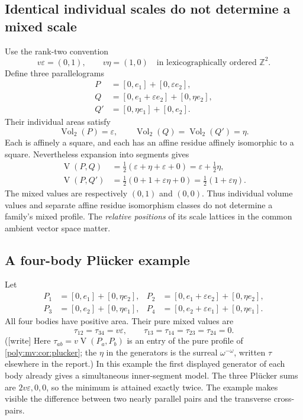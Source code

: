 \documentclass[11pt,a4paper]{article}
\numberwithin{equation}{section}
\theoremstyle{plain}
\newcommand{\wtag}{\textup{[write]}}%
\newcommand{\Z}{\mathbb Z}
\newcommand{\eps}{\varepsilon}
\newcommand{\Vol}{\operatorname{Vol}}
\newcommand{\MV}{\operatorname{V}}
\begin{document}
\subsection{Identical individual scales do not determine a mixed scale}
Use the rank-two convention
\[
 v\eps=(0,1),\qquad v\eta=(1,0)
 \quad\text{in lexicographically ordered }\Z^2.
\]
Define three parallelograms
\begin{align*}
 P&=[0,e_1]+[0,\eps e_2],\\
 Q&=[0,e_1+\eps e_2]+[0,\eta e_2],\\
 Q'&=[0,\eta e_1]+[0,e_2].
\end{align*}
Their individual areas satisfy
\[
 \Vol_2(P)=\eps,
 \qquad \Vol_2(Q)=\Vol_2(Q')=\eta.
\]
Each is affinely a square, and each has an affine residue affinely
isomorphic to a square. Nevertheless expansion into segments gives
\begin{align*}
 \MV(P,Q)
 &=\tfrac12(\eps+\eta+\eps+0)=\eps+\tfrac12\eta,\\
 \MV(P,Q')
 &=\tfrac12(0+1+\eps\eta+0)=\tfrac12(1+\eps\eta).
\end{align*}
The mixed values are respectively $(0,1)$ and $(0,0)$. Thus individual
volume values and separate affine residue isomorphism classes do not
determine a family's mixed profile. The \emph{relative positions} of its
scale lattices in the common ambient vector space matter.

\subsection{A four-body Pl\"ucker example}
Let
\begin{align*}
 P_1&=[0,e_1]+[0,\eta e_2],&
 P_2&=[0,e_1+\eps e_2]+[0,\eta e_2],\\
 P_3&=[0,e_2]+[0,\eta e_1],&
 P_4&=[0,e_2+\eps e_1]+[0,\eta e_1].
\end{align*}
All four bodies have positive area. Their pure mixed values are
\[
 \tau_{12}=\tau_{34}=v\eps,
 \qquad
 \tau_{13}=\tau_{14}=\tau_{23}=\tau_{24}=0.
\]
(\wtag{} Here $\tau_{ab}=v\MV(P_a,P_b)$ is an entry of the pure profile of
\cref{poly:mv:cor:plucker}; the $\eta$ in the generators is the surreal
$\omega^{-\omega}$, written $\tau$ elsewhere in the report.)
In this example the first displayed generator of each body already gives
a simultaneous inner-segment model. The three Pl\"ucker sums are
$2v\eps,0,0$, so the minimum is attained exactly twice. The example
makes visible the difference between two nearly parallel pairs and the
transverse cross-pairs.
\end{document}
